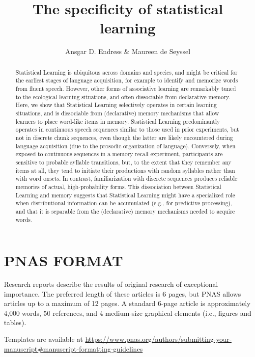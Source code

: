 \documentclass[]{article}
\title{The specificity of statistical learning}
\author{Ansgar D. Endress \& Maureen de Seyssel}
\date{}
\begin{document}
\maketitle
\begin{abstract}
Statistical Learning is ubiquitous across domains and species, and might be critical for the earliest stages of language acquisition, for example to identify and memorize words from fluent speech. However, other forms of associative learning are remarkably tuned to the ecological learning situations, and often dissociable from declarative memory. Here, we show that Statistical Learning selectively operates in certain learning situations, and is dissociable from (declarative) memory mechanisms that allow learners to place word-like items in memory. Statistical Learning predominantly operates in continuous speech sequences similar to those used in prior experiments, but not in discrete chunk sequences, even though the latter are likely encountered during language acquisition (due to the prosodic organization of language). Conversely, when exposed to continuous sequences in a memory recall experiment, participants are sensitive to probable syllable transitions, but, to the extent that they remember any items at all, they tend to initiate their productions with random syllables rather than with word onsets. In contrast, familiarization with discrete sequences produces reliable memories of actual, high-probability forms. This dissociation between Statistical Learning and memory suggests that Statistical Learning might have a specialized role when distributional information can be accumulated (e.g., for predictive processing), and that it is separable from the (declarative) memory mechanisms needed to acquire words.
\end{abstract}


\section{PNAS FORMAT}\label{pnas-format}

Research reports describe the results of original research of exceptional importance. The preferred length of these articles is 6 pages, but PNAS allows articles up to a maximum of 12 pages. A standard 6-page article is approximately 4,000 words, 50 references, and 4 medium-size graphical elements (i.e., figures and tables).

Templates are available at \url{https://www.pnas.org/authors/submitting-your-manuscript\#manuscript-formatting-guidelines}
\end{document}
